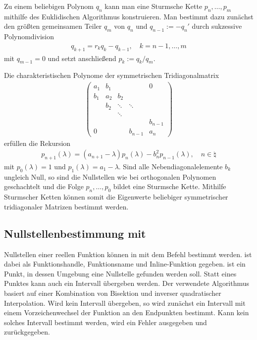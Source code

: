 \linie

Zu einem beliebigen Polynom $q_n$ kann man eine Sturmsche Kette
$p_n, \dotsc, p_m$ mithilfe des Euklidischen Algorithmus konstruieren.
Man bestimmt dazu zunächst den größten gemeinsamen Teiler $q_m$ von $q_n$
und $q_{n-1} := -q_n'$ durch sukzessive Polynomdivision
\begin{align*}
    q_{k+1} = r_k q_k - q_{k-1}, \quad
    k = n - 1, \dotsc, m
\end{align*}
mit $q_{m-1} = 0$ und setzt anschließend $p_k := q_k / q_m$.

\linie

Die charakteristischen Polynome der symmetrischen Tridiagonalmatrix
\begin{align*}
    \begin{pmatrix}
        a_1 & b_1 & & & 0 \\
        b_1 & a_2 & b_2 \\
        & b_2 & \ddots & \ddots \\
        & & \ddots \\
        & & & & b_{n-1} \\
        0 & & & b_{n-1} & a_n
    \end{pmatrix}
\end{align*}
erfüllen die Rekursion
\begin{align*}
    p_{n+1}(\lambda) = (a_{n+1} - \lambda) p_n(\lambda) -
    b_n^2 p_{n-1}(\lambda), \quad
    n \in \natural
\end{align*}
mit $p_0(\lambda) = 1$ und $p_1(\lambda) = a_1 - \lambda$.
Sind alle Nebendiagonalelemente $b_k$ ungleich Null, so sind die Nullstellen
wie bei orthogonalen Polynomen geschachtelt und die Folge
$p_n, \dotsc, p_0$ bildet eine Sturmsche Kette.
Mithilfe Sturmscher Ketten können somit die Eigenwerte beliebiger
symmetrischer tridiagonaler Matrizen bestimmt werden.

\subsection{%
    Nullstellenbestimmung mit \matlab{}%
}

Nullstellen einer reellen Funktion  können in \matlab{} mit dem Befehl
 bestimmt werden.
 ist dabei als Funktionshandle, Funktionsname und Inline-Funktion
gegeben.
 ist ein Punkt, in dessen Umgebung eine Nullstelle gefunden werden
soll.
Statt eines Punktes kann auch ein Intervall \code{[a, b]} übergeben werden.
Der verwendete Algorithmus basiert auf einer Kombination von Bisektion und
inverser quadratischer Interpolation.
Wird kein Intervall übergeben, so wird zunächst ein Intervall mit einem
Vorzeichenwechsel der Funktion an den Endpunkten bestimmt.
Kann kein solches Intervall bestimmt werden, wird ein Fehler ausgegeben
und  zurückgegeben.

